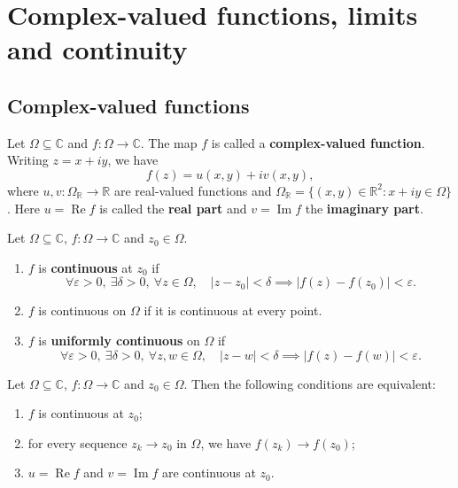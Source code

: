 \section{Complex-valued functions, limits and continuity}

\subsection{Complex-valued functions}

\begin{definition}\label{def:ca_complex_function}
Let $\Omega \subseteq \mathbb{C}$ and $f: \Omega \to \mathbb{C}$. The map $f$ is called a \textbf{complex-valued function}. Writing $z = x + iy$, we have
\[
f(z) = u(x, y) + i v(x, y),
\]
where $u, v: \Omega_{\mathbb{R}} \to \mathbb{R}$ are real-valued functions and $\Omega_{\mathbb{R}} = \{(x, y) \in \mathbb{R}^2 : x + iy \in \Omega\}$. Here $u = \operatorname{Re} f$ is called the \textbf{real part} and $v = \operatorname{Im} f$ the \textbf{imaginary part}.
\end{definition}

\begin{definition}\label{def:ca_limit_continuous}
Let $\Omega \subseteq \mathbb{C}$, $f: \Omega \to \mathbb{C}$ and $z_0 \in \Omega$.
\begin{enumerate}[label=(\roman*)]
    \item $f$ is \textbf{continuous} at $z_0$ if
    \[
    \forall \varepsilon > 0,\ \exists \delta > 0,\ \forall z \in \Omega,\quad |z - z_0| < \delta \implies |f(z) - f(z_0)| < \varepsilon.
    \]
    \item $f$ is continuous on $\Omega$ if it is continuous at every point.
    \item $f$ is \textbf{uniformly continuous} on $\Omega$ if
    \[
    \forall \varepsilon > 0,\ \exists \delta > 0,\ \forall z, w \in \Omega,\quad |z - w| < \delta \implies |f(z) - f(w)| < \varepsilon.
    \]
\end{enumerate}
\end{definition}

\begin{proposition}\label{prop:ca_continuity_equivalent}
Let $\Omega \subseteq \mathbb{C}$, $f: \Omega \to \mathbb{C}$ and $z_0 \in \Omega$. Then the following conditions are equivalent:
\begin{enumerate}[label=(\roman*)]
    \item $f$ is continuous at $z_0$;
    \item for every sequence $z_k \to z_0$ in $\Omega$, we have $f(z_k) \to f(z_0)$;
    \item $u = \operatorname{Re} f$ and $v = \operatorname{Im} f$ are continuous at $z_0$.
\end{enumerate}
\end{proposition}

